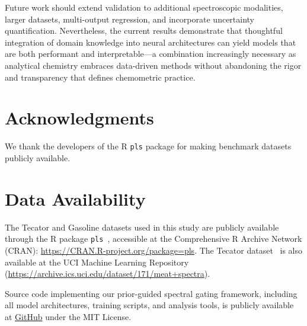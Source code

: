 \documentclass[preprint,12pt]{elsarticle}
\begin{document}
Future work should extend validation to additional spectroscopic modalities, larger datasets, multi-output regression, and incorporate uncertainty quantification. Nevertheless, the current results demonstrate that thoughtful integration of domain knowledge into neural architectures can yield models that are both performant and interpretable---a combination increasingly necessary as analytical chemistry embraces data-driven methods without abandoning the rigor and transparency that defines chemometric practice.

\section*{Acknowledgments}

We thank the developers of the R \texttt{pls} package for making benchmark datasets publicly available.

\section*{Data Availability}

The Tecator and Gasoline datasets used in this study are publicly 
available through the R package \texttt{pls}~\cite{mevik2007pls}, 
accessible at the Comprehensive R Archive Network (CRAN): 
\url{https://CRAN.R-project.org/package=pls}. 
The Tecator dataset~\cite{toenessen1991fat} is also available at 
the UCI Machine Learning Repository 
(\url{https://archive.ics.uci.edu/dataset/171/meat+spectra}).

Source code implementing our prior-guided spectral gating framework, 
including all model architectures, training scripts, and analysis tools, 
is publicly available at 
\href{https://github.com/clarimar/prior-guided-spectral-gating}{GitHub} 
under the MIT License.

 

\end{document}
